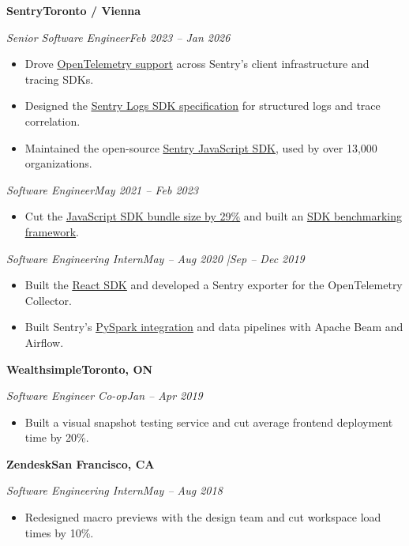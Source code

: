 \documentclass[11pt,letterpaper]{article}
\newcommand{\employer}[2]{%
  \par\addvspace{4bp}%
  {\fontsize{13bp}{15bp}\selectfont\bfseries #1}\hfill{\bfseries #2}\par\nobreak
}
\newcommand{\role}[2]{%
  \textit{#1}\hfill{\fontsize{11bp}{14bp}\selectfont\itshape #2}\par\nobreak
}
\newcommand{\resumeLink}[2]{\href{#1}{\textcolor{linkblue}{\underline{#2}}}}
\begin{document}
\employer{Sentry}{Toronto / Vienna}
\role{Senior Software Engineer}{Feb 2023 -- Jan 2026}
\begin{itemize}
  \item Drove \resumeLink{https://github.com/getsentry/sentry/discussions/40712}{OpenTelemetry support} across Sentry's client infrastructure and tracing SDKs.
  \item Designed the \resumeLink{https://develop.sentry.dev/sdk/telemetry/logs/}{Sentry Logs SDK specification} for structured logs and trace correlation.
  \item Maintained the open-source \resumeLink{https://github.com/getsentry/sentry-javascript}{Sentry JavaScript SDK}, used by over 13,000 organizations.
\end{itemize}
\vspace{3bp}
\role{Software Engineer}{May 2021 -- Feb 2023}
\begin{itemize}
  \item Cut the \resumeLink{https://blog.sentry.io/javascript-sdk-package-reduced/}{JavaScript SDK bundle size by 29\%} and built an
    \resumeLink{https://github.com/getsentry/sentry-sdk-benchmark}{SDK benchmarking framework}.
\end{itemize}
\vspace{3bp}
\role{Software Engineering Intern}{May -- Aug 2020 \enspace|\enspace Sep -- Dec 2019}
\begin{itemize}
  \item Built the \resumeLink{https://www.npmjs.com/package/@sentry/react}{React SDK} and developed a Sentry exporter for the OpenTelemetry Collector.
  \item Built Sentry's \resumeLink{https://docs.sentry.io/platforms/python/pyspark/}{PySpark integration} and data pipelines with Apache Beam and Airflow.
\end{itemize}

\employer{Wealthsimple}{Toronto, ON}
\role{Software Engineer Co-op}{Jan -- Apr 2019}
\begin{itemize}
  \item Built a visual snapshot testing service and cut average frontend deployment time by 20\%.
\end{itemize}

\employer{Zendesk}{San Francisco, CA}
\role{Software Engineering Intern}{May -- Aug 2018}
\begin{itemize}
  \item Redesigned macro previews with the design team and cut workspace load times by 10\%.
\end{itemize}
\end{document}
